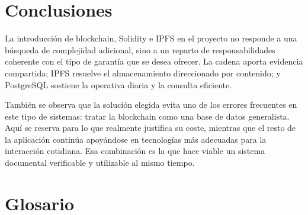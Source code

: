 \documentclass[11pt, a4paper]{article}
\begin{document}
\section{Conclusiones}

La introducción de blockchain, Solidity e IPFS en el proyecto no responde a una búsqueda de complejidad adicional, sino a un reparto de responsabilidades coherente con el tipo de garantía que se desea ofrecer. La cadena aporta evidencia compartida; IPFS resuelve el almacenamiento direccionado por contenido; y PostgreSQL sostiene la operativa diaria y la consulta eficiente.

También se observa que la solución elegida evita uno de los errores frecuentes en este tipo de sistemas: tratar la blockchain como una base de datos generalista. Aquí se reserva para lo que realmente justifica su coste, mientras que el resto de la aplicación continúa apoyándose en tecnologías más adecuadas para la interacción cotidiana. Esa combinación es la que hace viable un sistema documental verificable y utilizable al mismo tiempo.

\section{Glosario}
\end{document}
